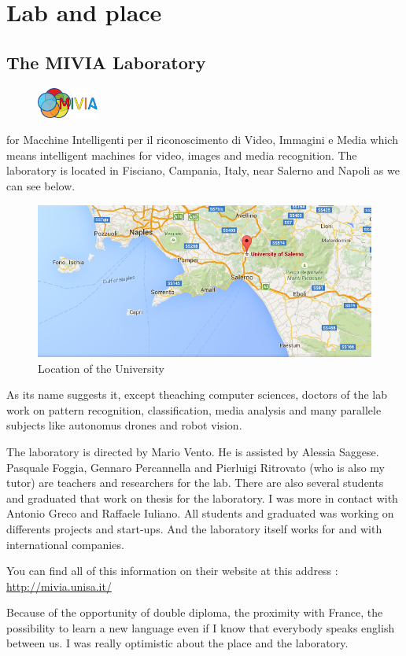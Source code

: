 \chapter{Lab and place}
\section{The MIVIA Laboratory}

\begin{figure}
	\vspace{-7mm}
	\includegraphics[width=2cm]{images_not_compressed/MIVIALogo.jpg}
	\end{figure}
 for Macchine Intelligenti per il riconoscimento di Video, Immagini e Media which means intelligent machines for video, images and media recognition. The laboratory is located in Fisciano, Campania, Italy, near Salerno and Napoli as we can see below.
 \begin{figure}[h]
 \begin{center}
	 \includegraphics[width=12cm]{images_not_compressed/geoUniversity.png}
		\caption{Location of the University}
	 \end{center}
 \end{figure}
 \par As its name suggests it, except theaching computer sciences, doctors of the lab work on pattern recognition, classification, media analysis and many parallele subjects like autonomus drones and robot vision.
 \par The laboratory is directed by Mario Vento. He is assisted by Alessia Saggese. Pasquale Foggia, Gennaro Percannella and Pierluigi Ritrovato (who is also my tutor) are teachers and researchers for the lab. There are also several students and graduated that work on thesis for the laboratory. I was more in contact with Antonio Greco and Raffaele Iuliano. All students and graduated was working on differents projects and start-ups. And the laboratory itself works for and with international companies.
 \par You can find all of this information on their website at this address : \url{http://mivia.unisa.it/}
 \par Because of the opportunity of double diploma, the proximity with France, the possibility to learn a new language even if I know that everybody speaks english between us. I was really optimistic about the place and the laboratory.
	 
